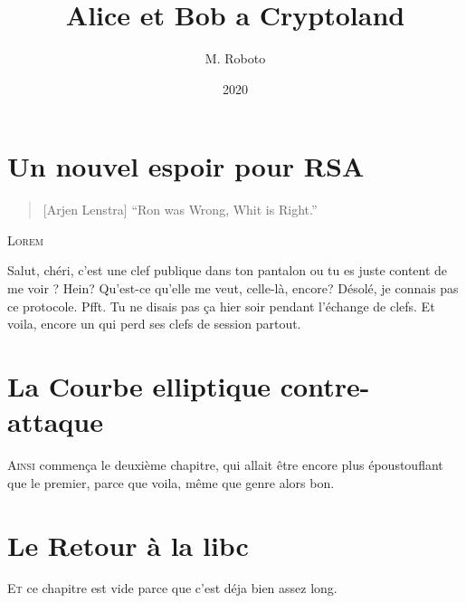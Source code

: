 \documentclass[a4paper,12pt,oneside]{memoir}
\title{Alice et Bob a Cryptoland}
\author{M. Roboto}
\date{2020}
\begin{document}
\maketitle
\tableofcontents*

\chapter{Un nouvel espoir pour RSA}

\begin{quote}[Arjen Lenstra]
	\enquote{Ron was Wrong, Whit is Right.}
\end{quote}	

\lettrine{L}{orem} \lipsum[1-4]

\begin{chatlog}
	\say[Alice] Salut, chéri, c'est une clef publique dans ton pantalon ou tu es juste content de me voir ?
	\think[Bob] Hein? Qu'est-ce qu'elle me veut, celle-là, encore?
	\say[Bob] Désolé, je connais pas ce protocole.
	\say[Alice] Pfft. Tu ne disais pas ça hier soir pendant l'échange de clefs.
	\think[Alice] Et voila, encore un qui perd ses clefs de session partout.
\end{chatlog}

\lipsum[5-7]


\chapter{La Courbe elliptique contre-attaque}

\lettrine{A}{insi} commença le deuxième chapitre, qui allait être encore plus
époustouflant que le premier, parce que voila, même que genre alors bon.

\lipsum

\chapter{Le Retour à la libc}

\lettrine{E}{t} ce chapitre est vide parce que c'est déja bien assez long.
\end{document}
